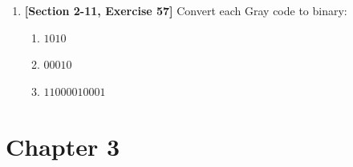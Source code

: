 \documentclass[11pt]{article}
\begin{document}
\begin{enumerate}

\item \textbf{[Section 2-11, Exercise 57]}
Convert each Gray code to binary:

\begin{enumerate}[label=(\alph*)]
    \item $1010$
    \item $00010$
    \item $11000010001$
\end{enumerate}

\end{enumerate}



\section{Chapter 3}
\end{document}
